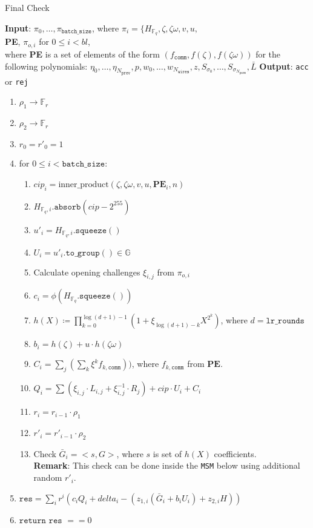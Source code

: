\begin{algorithm}[H]
\caption{Final Check}
\textbf{Input}: $\pi_0, \dots, \pi_{\texttt{batch\_size}}$, where $\pi_i = \{H_{\mathbb{F}_q}, \zeta, \zeta\omega, v, u,$ \\ %
		\textbf{PE},
		$\pi_{o, i}$ for $0 \leq i < bl$, \\
		where \textbf{PE} is a set of elements of the form $(f_{\texttt{comm}}, f(\zeta), f(\zeta\omega))$ for the following polynomials:
		$\eta_0, \dots, \eta_{N_{\texttt{prev}}}, p, w_0, \dots, w_{N_{\texttt{wires}}}, z, S_{\sigma_0}, \dots, S_{\sigma_{N_{\texttt{perm}}}}, \bar{L}$
\textbf{Output}: \texttt{acc} or \texttt{rej}
\begin{enumerate}
	\item $\rho_1 \rightarrow \mathbb{F}_r$
	\item $\rho_2 \rightarrow \mathbb{F}_r$
	\item $r_0 = r'_0 = 1$
	\item for $0 \leq i < \texttt{batch\_size}$:
	\begin{enumerate}
		\item $cip_i = \text{inner\_product}(\zeta, \zeta\omega, v, u, \textbf{PE}_i, n)$
		\item $H_{\mathbb{F}_q, i}.\texttt{absorb}(cip - 2^255)$
		\item $u'_i = H_{\mathbb{F}_q, i}.\texttt{squeeze}()$
		\item $U_i = u'_i.\texttt{to\_group}() \in \mathbb{G}$
		\item Calculate opening challenges $\xi_{i, j}$ from $\pi_{o, i}$
		\item $c_i = \phi(H_{\mathbb{F}_q}.\texttt{squeeze}())$
		\item $h(X) \coloneqq \prod_{k=0}^{\log(d+1) - 1}(1 + \xi_{\log(d+1)-k}X^{2^k})$, where $d = \texttt{lr\_rounds}$
		\item $b_i = h(\zeta) + u \cdot h(\zeta\omega)$
		\item $C_i = \sum\limits_{j}(\sum\limits_{k}\xi^k f_{k, \texttt{comm}}))$, where $f_{k, \texttt{comm}}$ from $\textbf{PE}$.
		\item $Q_i = \sum (\xi_{i, j} \cdot L_{i, j} + \xi_{i, j}^{-1} \cdot R_j) + cip \cdot U_i + C_i$
		\item $r_i = r_{i - 1} \cdot \rho_1$
		\item $r'_i = r'_{i - 1} \cdot \rho_2$
		\item Check $\bar{G}_i = <s, G>$, where $s$ is set of $h(X)$ coefficients. \\
		\textbf{Remark}: This check can be done inside the \texttt{MSM} below using additional random $r'_i$.
	\end{enumerate}
	\item $\texttt{res} = \sum\limits_i r^i (c_i Q_i + delta_i - ( z_{1, i} (\bar{G}_i + b_i U_i) + z_{2, i} H ))$
	\item $\texttt{return res } == 0$
\end{enumerate}
\end{algorithm}

